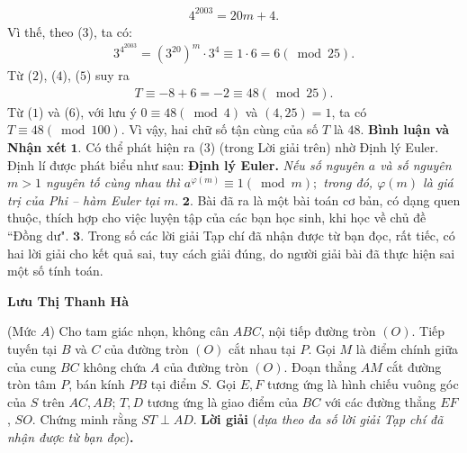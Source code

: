 \begin{multicols}{2}
	\begin{align*}
		{4^{2003}} = 20m + 4.
	\end{align*}
	Vì thế, theo ($3$), ta có:
	\begin{align*}
		{3^{{4^{2003}}}} \!\!=\!\! {\left(\! {{3^{20}}} \right)^m} \!\!\cdot\! {3^4} \!\equiv \!\!1 \!\!\cdot\! 6 \!=\! 6\left(\! {\bmod 25} \right). \tag{$5$}
	\end{align*}
	Từ ($2$), ($4$), ($5$) suy ra
	\begin{align*}
		T \equiv  - 8 + 6 =  - 2 \equiv 48\left( {\bmod 25} \right). \tag{$6$}
	\end{align*}
	Từ ($1$) và ($6$), với lưu ý $0 \equiv 48\left( {\bmod 4} \right)$ và $(4, 25) = 1$, ta có  $T \equiv 48\left( {\bmod 100} \right)$.
	\vskip 0.05cm
	Vì vậy, hai chữ số tận cùng của số $T$ là $48$.
	\vskip 0.05cm
	\textbf{\color{thachthuctoanhoc}Bình luận và Nhận xét}
	\vskip 0.05cm
	$\pmb{1.}$ Có thể phát hiện ra ($3$) (trong Lời giải trên) nhờ Định lý Euler. Định lí được phát biểu như sau:
	\vskip 0.05cm
	\textbf{\color{thachthuctoanhoc}Định lý Euler.} \textit{Nếu số nguyên $a$ và số nguyên $m > 1$ nguyên tố cùng nhau thì  ${a^{\varphi \left( m \right)}} \equiv 1\left( {\bmod m} \right);$ trong đó, $\varphi \left( m \right)$  là giá trị của Phi -- hàm Euler tại $m$}.
	\vskip 0.05cm
	$\pmb{2.}$ Bài đã ra là một bài toán cơ bản, có dạng quen thuộc, thích hợp cho việc luyện tập của các bạn học sinh, khi học về chủ đề ``Đồng dư".
	\vskip 0.05cm
	$\pmb{3.}$ Trong số các lời giải Tạp chí đã nhận được từ bạn đọc, rất tiếc, có hai lời giải cho kết quả sai, tuy cách giải đúng, do người giải bài đã thực hiện sai một số tính toán.
	\begin{flushright}
		\textbf{\color{thachthuctoanhoc}Lưu Thị Thanh Hà}
	\end{flushright}
	{}
	(Mức $A$) Cho tam giác nhọn, không cân $A B C$, nội tiếp đường tròn $(O)$. Tiếp tuyến tại $B$ và $C$ của đường tròn $(O)$ cắt nhau tại $P$. Gọi $M$ là điểm chính giữa của cung $B C$ không chứa $A$ của đường tròn $(O)$. Đoạn thẳng $A M$ cắt đường tròn tâm $P$, bán kính $P B$ tại điểm $S$. Gọi $E, F$ tương ứng là hình chiếu vuông góc của $S$ trên $A C, A B$; $T, D$ tương ứng là giao điểm của $B C$ với các đường thẳng $E F$, $SO$.  Chứng minh rằng $ST \perp A D$.
	\vskip 0.05cm
	\textbf{\color{thachthuctoanhoc}Lời giải} (\textit{dựa theo đa số lời giải Tạp chí đã nhận được từ bạn đọc})\textbf{\color{thachthuctoanhoc}.}
	\begin{figure}[H]
		\centering

\end{figure}
\end{multicols}
